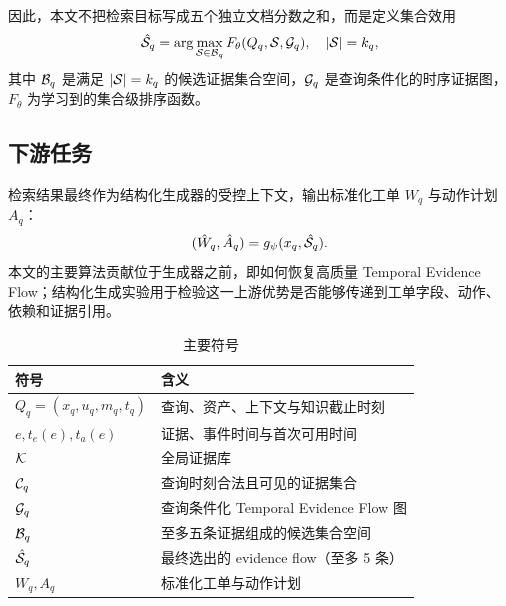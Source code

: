 因此，本文不把检索目标写成五个独立文档分数之和，而是定义集合效用
\begin{equation}
\hat{\mathcal{S}}_q
=
\arg\max_{\mathcal{S}\in\mathcal{B}_q}
F_{\theta}(Q_q,\mathcal{S},\mathcal{G}_q),
\quad |\mathcal{S}|=k_q,
\label{eq:set_selection}
\end{equation}
其中 $\mathcal{B}_q$ 是满足 $|\mathcal{S}|=k_q$ 的候选证据集合空间，$\mathcal{G}_q$ 是查询条件化的时序证据图，$F_{\theta}$ 为学习到的集合级排序函数。

\subsection{下游任务}

检索结果最终作为结构化生成器的受控上下文，输出标准化工单 $W_q$ 与动作计划 $A_q$：
\begin{equation}
(\hat W_q,\hat A_q)=g_{\psi}(x_q,\hat{\mathcal{S}}_q).
\label{eq:downstream_generation}
\end{equation}
本文的主要算法贡献位于生成器之前，即如何恢复高质量 Temporal Evidence Flow；结构化生成实验用于检验这一上游优势是否能够传递到工单字段、动作、依赖和证据引用。

\begin{table}[t]
\caption{主要符号}
\label{tab:symbols}
\centering
\small
\begin{tabular}{@{}p{}p{}@{}}
\toprule
符号 & 含义 \\
\midrule
$Q_q=(x_q,u_q,m_q,t_q)$ & 查询、资产、上下文与知识截止时刻 \\
$e,t_e(e),t_a(e)$ & 证据、事件时间与首次可用时间 \\
$\mathcal{K}$ & 全局证据库 \\
$\mathcal{C}_q$ & 查询时刻合法且可见的证据集合 \\
$\mathcal{G}_q$ & 查询条件化 Temporal Evidence Flow 图 \\
$\mathcal{B}_q$ & 至多五条证据组成的候选集合空间 \\
$\hat{\mathcal{S}}_q$ & 最终选出的 evidence flow（至多 5 条） \\
$W_q,A_q$ & 标准化工单与动作计划 \\
\bottomrule
\end{tabular}
\end{table}
